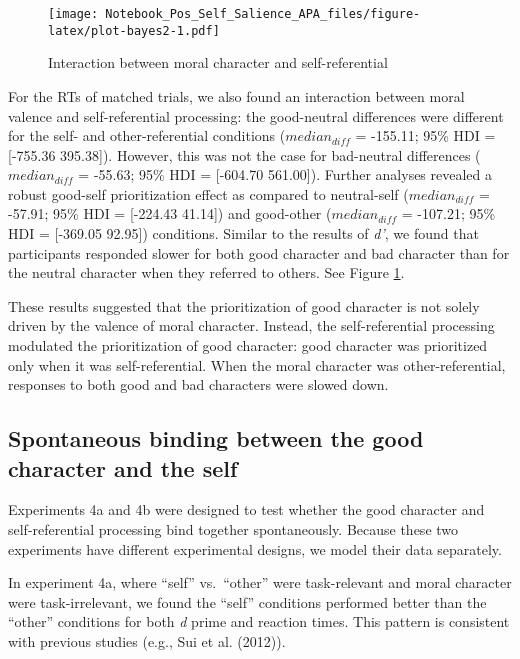 \documentclass[
  man]{apa6}
\begin{document}
\begin{figure}
\centering
\texttt{[image: Notebook\_Pos\_Self\_Salience\_APA\_files/figure-latex/plot-bayes2-1.pdf]}
\caption{\label{fig:plot-bayes2}Interaction between moral character and self-referential}
\end{figure}

For the RTs of matched trials, we also found an interaction between moral valence and self-referential processing: the good-neutral differences were different for the self- and other-referential conditions (\(median_{diff}\) = -155.11; 95\% HDI = {[}-755.36 395.38{]}). However, this was not the case for bad-neutral differences (\(median_{diff}\) = -55.63; 95\% HDI = {[}-604.70 561.00{]}). Further analyses revealed a robust good-self prioritization effect as compared to neutral-self (\(median_{diff}\) = -57.91; 95\% HDI = {[}-224.43 41.14{]}) and good-other (\(median_{diff}\) = -107.21; 95\% HDI = {[}-369.05 92.95{]}) conditions. Similar to the results of \emph{d'}, we found that participants responded slower for both good character and bad character than for the neutral character when they referred to others. See Figure \ref{fig:plot-bayes2}.

These results suggested that the prioritization of good character is not solely driven by the valence of moral character. Instead, the self-referential processing modulated the prioritization of good character: good character was prioritized only when it was self-referential. When the moral character was other-referential, responses to both good and bad characters were slowed down.

\hypertarget{spontaneous-binding-between-the-good-character-and-the-self}{%
\subsection{Spontaneous binding between the good character and the self}\label{spontaneous-binding-between-the-good-character-and-the-self}}

Experiments 4a and 4b were designed to test whether the good character and self-referential processing bind together spontaneously. Because these two experiments have different experimental designs, we model their data separately.

In experiment 4a, where ``self'' vs.~``other'' were task-relevant and moral character were task-irrelevant, we found the ``self'' conditions performed better than the ``other'' conditions for both \emph{d} prime and reaction times. This pattern is consistent with previous studies (e.g., Sui et al. (2012)).
\end{document}
